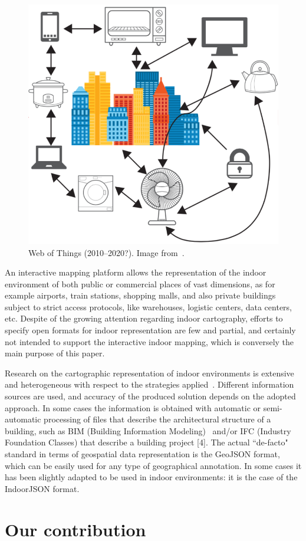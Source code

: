 \documentclass{sig-alternate}
\begin{document}
\begin{figure}[htbp]
\centering
\includegraphics[width=.5\linewidth]{images/webOfThings.pdf}
\caption{Web of Things (2010--2020?).  Image from~\cite{webOfThings:2015}.}
\label{fig:web-of-thing}
\end{figure}


An interactive mapping platform allows the representation of the indoor
environment of  both public or commercial places of vast dimensions, as for
example airports, train stations, shopping malls, and also private buildings
subject to strict access protocols, like warehouses, logistic centers, data
centers, etc. Despite of the growing attention regarding indoor cartography,
efforts to specify open formats for indoor representation are few and partial,
and certainly not intended to support the interactive indoor mapping, which is
conversely the main purpose of this paper.

Research on the cartographic representation of indoor environments is
extensive and heterogeneous with respect to the strategies
applied~\cite{6418876}. Different information sources are used, and accuracy
of the produced solution depends on the adopted approach. In some cases the
information is obtained with automatic or semi-automatic processing of files
that describe the architectural structure of a building, such as BIM (Building
Information Modeling)~\cite{Eastman:2008:BHG:1796500} and/or IFC (Industry
Foundation Classes) that describe a building project [4].  The actual ``de-facto" 
standard in terms of geospatial data representation is the GeoJSON
format, which can be easily used for any type of geographical annotation. In
some cases it has been slightly adapted to be used in indoor environments: it
is the case of the IndoorJSON format.



\section{Our contribution}
\end{document}
